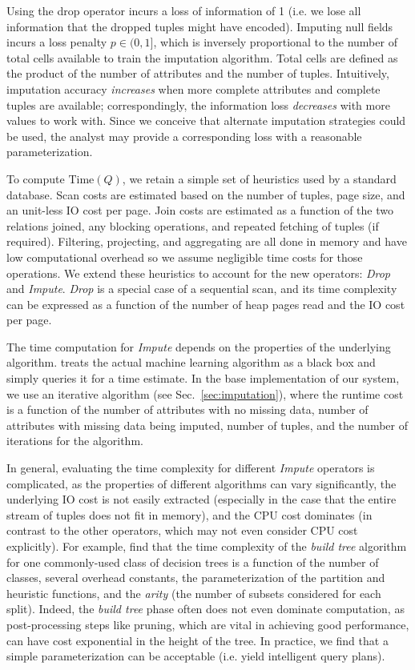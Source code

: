 Using the drop operator incurs a loss of information of 1 (i.e. we lose all information that
the dropped tuples might have encoded). Imputing null fields incurs a loss penalty $p \in (0, 1]$,
which is inversely proportional to the number of total cells available to train the imputation algorithm. 
Total cells are defined as the product of the number of attributes and the number of tuples.
Intuitively, imputation
accuracy \textit{increases} when more complete attributes and complete tuples are available;
correspondingly, the information loss \textit{decreases} with more values to work
with. Since we conceive that
alternate imputation strategies could be used, the analyst may provide a corresponding
loss with a reasonable parameterization.

To compute $\text{Time}(Q)$, we retain a simple set of heuristics used by a standard 
database. Scan costs are estimated based on the number of tuples, 
page size, and an unit-less IO cost per page. Join costs are estimated as a function
of the two relations joined, any blocking operations, and repeated fetching of tuples (if required).
Filtering, projecting, and aggregating are all done in memory and have low computational overhead
so we assume negligible time costs for those operations. We extend these heuristics to 
account for the new operators: \textit{Drop} and \textit{Impute}. \textit{Drop} is a special case of a sequential scan, and its time
complexity can be expressed as a function of the number of heap pages read and the IO cost
per page.

The time computation for \textit{Impute} depends on the properties of the underlying
algorithm. \ProjectName{} treats the actual machine learning algorithm as a black box
and simply queries it for a time estimate. In the base implementation of our system,
we use an iterative algorithm (see Sec.~\ref{sec:imputation}), where the runtime cost
is a function of the number of attributes with no missing data, number of attributes with
missing data being imputed, number of tuples, and the number of iterations for the algorithm.

In general, evaluating the time complexity for different \textit{Impute} operators is
complicated, as the properties of
different algorithms can vary significantly, the underlying IO cost
is not easily extracted (especially in the case that the entire stream of tuples does not
fit in memory), and the CPU cost dominates (in contrast to the other operators, which may
not even consider CPU cost explicitly). For example, \cite{martin1995time} find that the
time complexity of the \textit{build tree} algorithm for one commonly-used class of
decision trees is a function of the number of classes, several overhead constants, the
parameterization of the partition and heuristic functions, and the \textit{arity} (the
number of subsets considered for each split). Indeed, the \textit{build tree} phase often
does not even dominate computation, as post-processing steps like pruning, which are vital
in achieving good performance, can have cost exponential in the height of the tree. In
practice, we find that a simple parameterization can be acceptable (i.e. yield intelligent query
plans).


